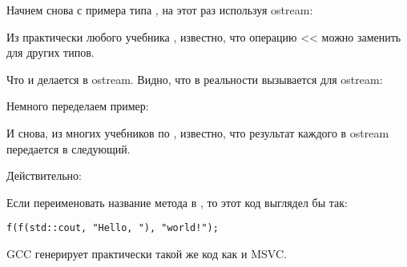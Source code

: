 
Начнем снова с примера типа , на этот раз используя ostream:



Из практически любого учебника \Cpp, известно, что операцию << можно заменить для других типов.

Что и делается в ostream.
Видно, что в реальности вызывается  для ostream:



Немного переделаем пример:



И снова, из многих учебников по \Cpp, известно, что результат каждого  
в ostream передается в следующий.

Действительно:



Если переименовать название метода  в \ttf{}, то этот код выглядел бы так:

\begin{lstlisting}
f(f(std::cout, "Hello, "), "world!");
\end{lstlisting}

GCC генерирует практически такой же код как и MSVC.

